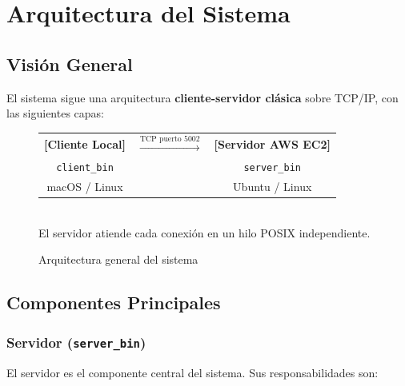 \documentclass[12pt,a4paper]{report}
\begin{document}
\chapter{Arquitectura del Sistema}

\section{Visión General}

El sistema sigue una arquitectura \textbf{cliente-servidor clásica} sobre TCP/IP, con las siguientes capas:

\begin{figure}[H]
  \centering
  \begin{tcolorbox}[colback=grisClaro, colframe=azulTitulo, width=0.85\textwidth,
                    title=\textbf{Diagrama de Arquitectura}]
    \centering
    \ttfamily\small
    \begin{tabular}{ccc}
      \textbf{[Cliente Local]} & $\xrightarrow{\text{TCP puerto 5002}}$ & \textbf{[Servidor AWS EC2]} \\
      \texttt{client\_bin}     &                                         & \texttt{server\_bin}        \\
      macOS / Linux            &                                         & Ubuntu / Linux              \\
    \end{tabular}\\[1em]
    \normalfont\small
    El servidor atiende cada conexión en un hilo POSIX independiente.
  \end{tcolorbox}
  \caption{Arquitectura general del sistema}
\end{figure}

\section{Componentes Principales}

\subsection{Servidor (\texttt{server\_bin})}

El servidor es el componente central del sistema. Sus responsabilidades son:
\end{document}
